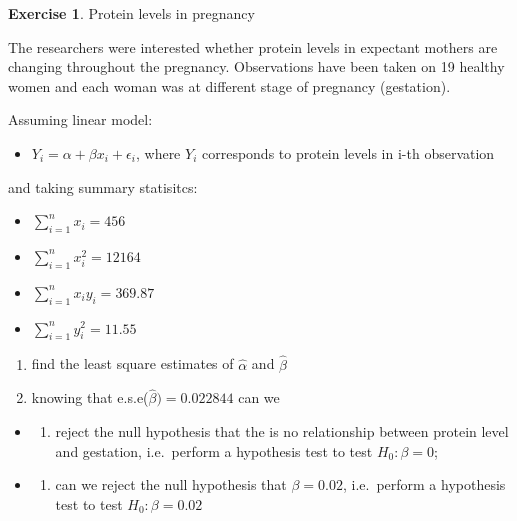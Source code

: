 \documentclass[
]{book}
\providecommand{\tightlist}{%
  \setlength{\itemsep}{0pt}\setlength{\parskip}{0pt}}
\theoremstyle{definition}
\theoremstyle{definition}
\theoremstyle{definition}
\newtheorem{exercise}{Exercise}[chapter]
\theoremstyle{remark}
\begin{document}
\begin{exercise}
\protect\hypertarget{exr:lm-protein}{}{\label{exr:lm-protein} }Protein levels in pregnancy

The researchers were interested whether protein levels in expectant mothers are changing throughout the pregnancy. Observations have been taken on 19 healthy women and each woman was at different stage of pregnancy (gestation).

Assuming linear model:

\begin{itemize}
\tightlist
\item
  \(Y_i = \alpha + \beta x_i + \epsilon_i\), where \(Y_i\) corresponds to protein levels in i-th observation
\end{itemize}

and taking summary statisitcs:

\begin{itemize}
\tightlist
\item
  \(\sum_{i=1}^{n}x_i = 456\)
\item
  \(\sum_{i=1}^{n}x_i^2 = 12164\)
\item
  \(\sum_{i=1}^{n}x_iy_i = 369.87\)
\item
  \(\sum_{i=1}^{n}y_i^2 = 11.55\)
\end{itemize}

\begin{enumerate}
\def\labelenumi{\alph{enumi})}
\tightlist
\item
  find the least square estimates of \(\hat{\alpha}\) and \(\hat{\beta}\)
\item
  knowing that e.s.e(\(\hat{\beta}) = 0.022844\) can we
\end{enumerate}

\begin{itemize}
\item
  \begin{enumerate}
  \def\labelenumi{\roman{enumi})}
  \tightlist
  \item
    reject the null hypothesis that the is no relationship between protein level and gestation, i.e.~perform a hypothesis test to test \(H_0:\beta = 0\);
  \end{enumerate}
\item
  \begin{enumerate}
  \def\labelenumi{\roman{enumi})}
  \setcounter{enumi}{1}
  \tightlist
  \item
    can we reject the null hypothesis that \(\beta = 0.02\), i.e.~perform a hypothesis test to test \(H_0:\beta = 0.02\)
  \end{enumerate}
\end{itemize}


\end{exercise}
\end{document}
